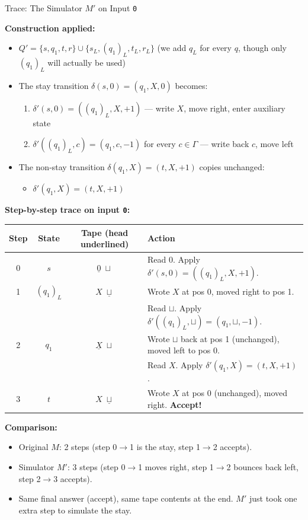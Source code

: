 \documentclass[11pt,a4paper]{article}
\begin{document}
\begin{examplebox}{Trace: The Simulator $M'$ on Input \texttt{0}}

\textbf{Construction applied:}
\begin{itemize}[nosep]
\item $Q' = \{s, q_1, t, r\} \cup \{s_L, (q_1)_L, t_L, r_L\}$ \quad (we add $q_L$ for every $q$, though only $(q_1)_L$ will actually be used)
\item The stay transition $\delta(s, 0) = (q_1, X, 0)$ becomes:
  \begin{enumerate}[nosep]
  \item $\delta'(s, 0) = ((q_1)_L, X, +1)$ \quad --- write $X$, move right, enter auxiliary state
  \item $\delta'((q_1)_L, c) = (q_1, c, -1)$ for every $c \in \Gamma$ \quad --- write back $c$, move left
  \end{enumerate}
\item The non-stay transition $\delta(q_1, X) = (t, X, +1)$ copies unchanged:
  \begin{itemize}[nosep]
  \item $\delta'(q_1, X) = (t, X, +1)$
  \end{itemize}
\end{itemize}

\textbf{Step-by-step trace on input \texttt{0}:}

\medskip
\begin{tabular}{cccl}
\toprule
Step & State & Tape (head underlined) & Action \\
\midrule
0 & $s$ & $\underline{0}\;\sqcup$ & Read $0$. Apply $\delta'(s, 0) = ((q_1)_L, X, +1)$. \\
1 & $(q_1)_L$ & $X\;\underline{\sqcup}$ & Wrote $X$ at pos 0, moved right to pos 1. \\
  &           &                         & Read $\sqcup$. Apply $\delta'((q_1)_L, \sqcup) = (q_1, \sqcup, -1)$. \\
2 & $q_1$ & $\underline{X}\;\sqcup$ & Wrote $\sqcup$ back at pos 1 (unchanged), moved left to pos 0. \\
  &       &                          & Read $X$. Apply $\delta'(q_1, X) = (t, X, +1)$. \\
3 & $t$ & $X\;\underline{\sqcup}$ & Wrote $X$ at pos 0 (unchanged), moved right. \textbf{Accept!} \\
\bottomrule
\end{tabular}

\medskip
\textbf{Comparison:}
\begin{itemize}[nosep]
\item Original $M$: 2 steps (step 0$\to$1 is the stay, step 1$\to$2 accepts).
\item Simulator $M'$: 3 steps (step 0$\to$1 moves right, step 1$\to$2 bounces back left, step 2$\to$3 accepts).
\item Same final answer (accept), same tape contents at the end. $M'$ just took one extra step to simulate the stay.
\end{itemize}
\end{examplebox}
\end{document}
